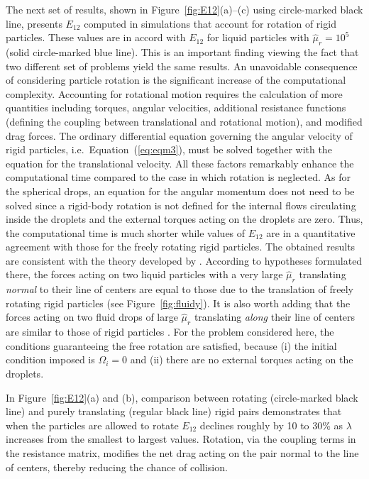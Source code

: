 \documentclass[../thesis.tex]{subfiles}
\begin{document}
The next set of results, shown in Figure~\ref{fig:E12}(a)--(c) using circle-marked black line, presents $E_{12}$ computed in simulations that account for rotation of rigid particles. These values are in accord with $E_{12}$ for liquid particles with $\hat{\mu}_r=10^5$ (solid circle-marked blue line). This is an important finding viewing the fact that two different set of problems yield the same results. An unavoidable consequence of considering particle rotation is the significant increase of the computational complexity. Accounting for rotational motion requires the calculation of more quantities including torques, angular velocities, additional resistance functions (defining the coupling between translational and rotational motion), and modified drag forces. The ordinary differential equation governing the angular velocity of rigid particles, i.e.\ Equation~(\ref{eq:eqm3}), must be solved together with the equation for the translational velocity. All these factors remarkably enhance the computational time compared to the case in which rotation is neglected. As for the spherical drops, an equation for the angular momentum does not need to be solved since a rigid-body rotation is not defined for the internal flows circulating inside the droplets and the external torques acting on the droplets are zero. Thus, the computational time is much shorter while values of $E_{12}$ are in a quantitative agreement with those for the freely rotating rigid particles. The obtained results are consistent with the theory developed by \cite{Z80}. According to hypotheses formulated there, the forces acting on two liquid particles with a very large $\hat{\mu}_r$ translating \textit{normal} to their line of centers are equal to those due to the translation of freely rotating rigid particles (see Figure~\ref{fig:fluidy}). It is also worth adding that the forces acting on two fluid drops of large $\hat{\mu}_r$ translating \textit{along} their line of centers \citep{WW72,HHS73} are similar to those of rigid particles \citep{SJ26,M61,JO84}. For the problem considered here, the conditions guaranteeing the free rotation are satisfied, because (i) the initial condition imposed is $\Omega_i = 0$ and (ii) there are no external torques acting on the droplets.

In Figure~\ref{fig:E12}(a) and (b), comparison between rotating (circle-marked black line) and purely translating (regular black line) rigid pairs demonstrates that when the particles are allowed to rotate $E_{12}$ declines roughly by 10 to 30\% as $\lambda$ increases from the smallest to largest values. Rotation, via the coupling terms in the resistance matrix, modifies the net drag acting on the pair normal to the line of centers, thereby reducing the chance of collision.
\end{document}
